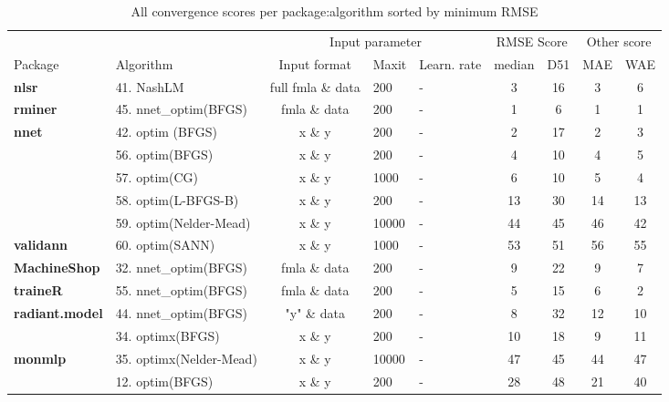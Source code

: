 \begin{Schunk}
\begin{table}[!h]

\caption{\label{tab:unnamed-chunk-8}All convergence scores per package:algorithm sorted by minimum RMSE}
\centering
\fontsize{7}{9}\selectfont
\begin{tabular}[t]{>{}llcllcccc}
\toprule
\multicolumn{2}{c}{ } & \multicolumn{3}{c}{Input parameter} & \multicolumn{2}{c}{RMSE Score} & \multicolumn{2}{c}{Other score} \\
\cmidrule(l{3pt}r{3pt}){3-5} \cmidrule(l{3pt}r{3pt}){6-7} \cmidrule(l{3pt}r{3pt}){8-9}
Package & Algorithm & Input format & Maxit & Learn. rate & median & D51 & MAE & WAE\\
\midrule
\textbf{nlsr} & 41. NashLM & full fmla \& data & 200 & - & 3 & 16 & 3 & 6\\
\cmidrule{1-9}
\textbf{rminer} & 45. nnet\_optim(BFGS) & fmla \& data & 200 & - & 1 & 6 & 1 & 1\\
\cmidrule{1-9}
\textbf{nnet} & 42. optim (BFGS) & x \& y & 200 & - & 2 & 17 & 2 & 3\\
\cmidrule{1-9}
 & 56. optim(BFGS) & x \& y & 200 & - & 4 & 10 & 4 & 5\\

 & 57. optim(CG) & x \& y & 1000 & - & 6 & 10 & 5 & 4\\

 & 58. optim(L-BFGS-B) & x \& y & 200 & - & 13 & 30 & 14 & 13\\

 & 59. optim(Nelder-Mead) & x \& y & 10000 & - & 44 & 45 & 46 & 42\\

\multirow{-5}{*}{\raggedright\arraybackslash \textbf{validann}} & 60. optim(SANN) & x \& y & 1000 & - & 53 & 51 & 56 & 55\\
\cmidrule{1-9}
\textbf{MachineShop} & 32. nnet\_optim(BFGS) & fmla \& data & 200 & - & 9 & 22 & 9 & 7\\
\cmidrule{1-9}
\textbf{traineR} & 55. nnet\_optim(BFGS) & fmla \& data & 200 & - & 5 & 15 & 6 & 2\\
\cmidrule{1-9}
\textbf{radiant.model} & 44. nnet\_optim(BFGS) & "y" \& data & 200 & - & 8 & 32 & 12 & 10\\
\cmidrule{1-9}
 & 34. optimx(BFGS) & x \& y & 200 & - & 10 & 18 & 9 & 11\\

\multirow{-2}{*}{\raggedright\arraybackslash \textbf{monmlp}} & 35. optimx(Nelder-Mead) & x \& y & 10000 & - & 47 & 45 & 44 & 47\\
\cmidrule{1-9}
 & 12. optim(BFGS) & x \& y & 200 & - & 28 & 48 & 21 & 40\\


\end{tabular}
\end{table}
\end{Schunk}
